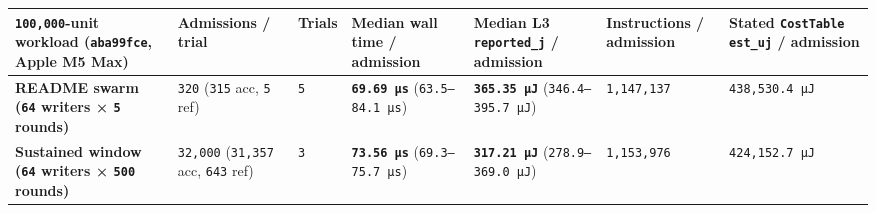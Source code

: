 \documentclass[10pt,letterpaper]{article}
\newcounter{none}
\begin{document}
{\def\LTcaptype{none} %
{\scriptsize\setlength{\tabcolsep}{3.0pt}\renewcommand{\arraystretch}{1.14}
\begin{longtable}[]{@{}
  >{\raggedright\arraybackslash}p{}
  >{\raggedleft\arraybackslash}p{}
  >{\raggedleft\arraybackslash}p{}
  >{\raggedleft\arraybackslash}p{}
  >{\raggedleft\arraybackslash}p{}
  >{\raggedleft\arraybackslash}p{}
  >{\raggedleft\arraybackslash}p{}@{}}
\toprule\noalign{}
\begin{minipage}[b]{\linewidth}\raggedright
\textbf{\texttt{100,000}-unit workload (\texttt{aba99fce}, Apple M5
Max)}
\end{minipage} & \begin{minipage}[b]{\linewidth}\raggedleft
\textbf{Admissions / trial}
\end{minipage} & \begin{minipage}[b]{\linewidth}\raggedleft
\textbf{Trials}
\end{minipage} & \begin{minipage}[b]{\linewidth}\raggedleft
\textbf{Median wall time / admission}
\end{minipage} & \begin{minipage}[b]{\linewidth}\raggedleft
\textbf{Median L3 \texttt{reported\_j} / admission}
\end{minipage} & \begin{minipage}[b]{\linewidth}\raggedleft
\textbf{Instructions / admission}
\end{minipage} & \begin{minipage}[b]{\linewidth}\raggedleft
\textbf{Stated \texttt{CostTable} \texttt{est\_uj} / admission}
\end{minipage} \\
\midrule\noalign{}
\endhead
\bottomrule\noalign{}
\endlastfoot
\textbf{README swarm (\texttt{64} writers × \texttt{5} rounds)} &
\texttt{320} (\texttt{315} acc, \texttt{5} ref) & \texttt{5} &
\textbf{\texttt{69.69\ µs}} (\texttt{63.5–84.1\ µs}) &
\textbf{\texttt{365.35\ µJ}} (\texttt{346.4–395.7\ µJ}) &
\texttt{1,147,137} & \texttt{438,530.4\ µJ} \\
\textbf{Sustained window (\texttt{64} writers × \texttt{500} rounds)} &
\texttt{32,000} (\texttt{31,357} acc, \texttt{643} ref) & \texttt{3} &
\textbf{\texttt{73.56\ µs}} (\texttt{69.3–75.7\ µs}) &
\textbf{\texttt{317.21\ µJ}} (\texttt{278.9–369.0\ µJ}) &
\texttt{1,153,976} & \texttt{424,152.7\ µJ} \\
\end{longtable}
}
}
\end{document}

